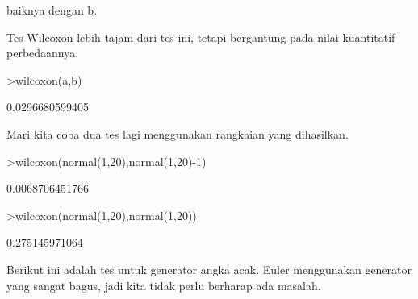 \documentclass[a4paper,10pt]{article}
\begin{document}
\begin{eulernotebook}
\begin{eulercomment}
\begin{eulercomment}
\begin{eulercomment}
\begin{eulercomment}
\begin{eulercomment}
\begin{eulercomment}
\begin{eulercomment}
\begin{eulercomment}
\begin{eulercomment}
\begin{eulercomment}
\begin{eulercomment}
\begin{eulercomment}
\begin{eulercomment}
\begin{eulercomment}
\begin{eulercomment}
\begin{eulercomment}
\begin{eulercomment}
\begin{eulercomment}
\begin{eulercomment}
baiknya dengan b.

Tes Wilcoxon lebih tajam dari tes ini, tetapi bergantung pada nilai
kuantitatif perbedaannya.
\end{eulercomment}
\begin{eulerprompt}
>wilcoxon(a,b)
\end{eulerprompt}
\begin{euleroutput}
  0.0296680599405
\end{euleroutput}
\begin{eulercomment}
Mari kita coba dua tes lagi menggunakan rangkaian yang dihasilkan.
\end{eulercomment}
\begin{eulerprompt}
>wilcoxon(normal(1,20),normal(1,20)-1)
\end{eulerprompt}
\begin{euleroutput}
  0.0068706451766
\end{euleroutput}
\begin{eulerprompt}
>wilcoxon(normal(1,20),normal(1,20))
\end{eulerprompt}
\begin{euleroutput}
  0.275145971064
\end{euleroutput}
\begin{eulercomment}
Berikut ini adalah tes untuk generator angka acak. Euler menggunakan
generator yang sangat bagus, jadi kita tidak perlu berharap ada
masalah.


\end{eulercomment}
\end{eulercomment}
\end{eulercomment}
\end{eulercomment}
\end{eulercomment}
\end{eulercomment}
\end{eulercomment}
\end{eulercomment}
\end{eulercomment}
\end{eulercomment}
\end{eulercomment}
\end{eulercomment}
\end{eulercomment}
\end{eulercomment}
\end{eulercomment}
\end{eulercomment}
\end{eulercomment}
\end{eulercomment}
\end{eulercomment}
\end{eulernotebook}
\end{document}
